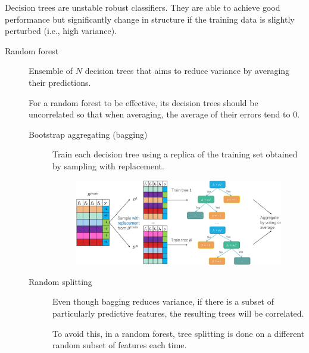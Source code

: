 \begin{description}
        \begin{remark}
            Decision trees are unstable robust classifiers. They are able to achieve good performance but significantly change in structure if the training data is slightly perturbed (i.e., high variance).
        \end{remark}

        \begin{description}
            \item[Random forest] 
                Ensemble of $N$ decision trees that aims to reduce variance by averaging their predictions.

                \begin{remark}
                    For a random forest to be effective, its decision trees should be uncorrelated so that when averaging, the average of their errors tend to $0$.
                \end{remark}

                \begin{description}
                    \item[Bootstrap aggregating (bagging)] 
                        Train each decision tree using a replica of the training set obtained by sampling with replacement.

                        \begin{figure}[H]
                            \raggedleft
                            \includegraphics[width=0.7\linewidth]{./img/_random_forest_bagging.jpg}
                        \end{figure}

                    \item[Random splitting] 
                        Even though bagging reduces variance, if there is a subset of particularly predictive features, the resulting trees will be correlated. 

                        To avoid this, in a random forest, tree splitting is done on a different random subset of features each time.


\end{description}
\end{description}
\end{description}
